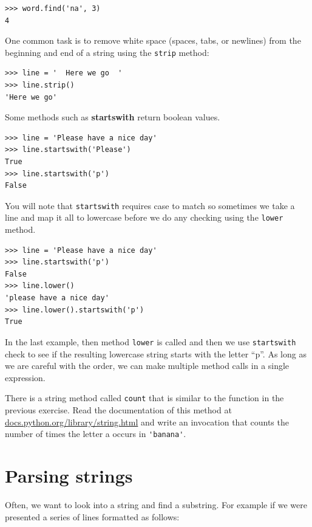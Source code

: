 \documentclass[10pt]{book}
\begin{document}

\beforeverb
\begin{verbatim}
>>> word.find('na', 3)
4
\end{verbatim}
\afterverb
%
One common task is to remove white space (spaces, tabs, or newlines) from
the beginning and end of a string using the {\tt strip} method:

\beforeverb
\begin{verbatim}
>>> line = '  Here we go  '
>>> line.strip()
'Here we go'
\end{verbatim}
\afterverb
%
Some methods such as {\bf startswith} return boolean values.

\beforeverb
\begin{verbatim}
>>> line = 'Please have a nice day'
>>> line.startswith('Please')
True
>>> line.startswith('p')
False
\end{verbatim}
\afterverb
%
You will note that {\tt startswith} requires case to match so sometimes
we take a line and map it all to lowercase before we do any checking
using the {\tt lower} method.

\beforeverb
\begin{verbatim}
>>> line = 'Please have a nice day'
>>> line.startswith('p')
False
>>> line.lower()
'please have a nice day'
>>> line.lower().startswith('p')
True
\end{verbatim}
\afterverb
%
In the last example, then method {\tt lower} is called
and then we use {\tt startswith}
check to see if the resulting lowercase string
starts with the letter ``p''.  As long as we are careful
with the order, we can make multiple method calls in a
single expression.

\begin{ex}

There is a string method called {\tt count} that is similar
to the function in the previous exercise.  Read the documentation
of this method at
\url{docs.python.org/library/string.html}
and write an invocation that counts the number of times the 
letter a  occurs
in \verb"'banana'".
\end{ex}

\section{Parsing strings}

Often, we want to look into a string and find a substring.  For example
if we were presented a series of lines formatted as follows:
\end{document}
